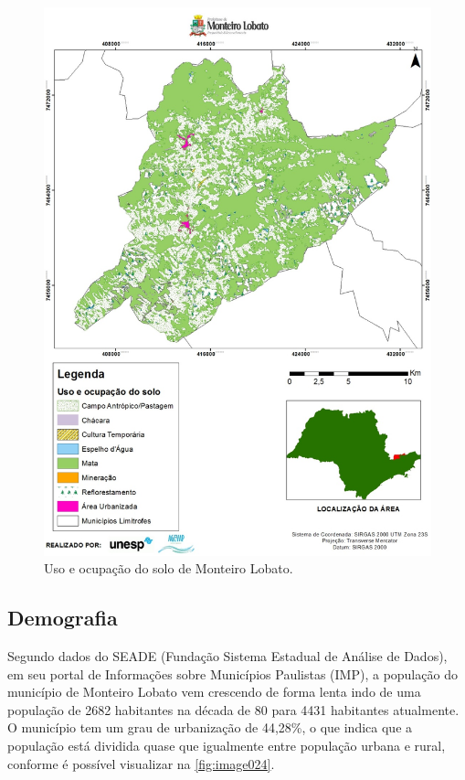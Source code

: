 \newpage
 \begin{figure}[h!]
	\centering
	\includegraphics[width=1\linewidth]{produtos/proddois/image023}
	\caption{Uso e ocupação do solo de Monteiro Lobato.}
	\label{fig:image023}
\end{figure}
\clearpage

\subsection{Demografia}
Segundo dados do SEADE (Fundação Sistema Estadual de Análise de Dados), em seu portal de Informações sobre Municípios Paulistas (IMP), a população do município de Monteiro Lobato vem crescendo de forma lenta indo de uma população de 2682 habitantes na década de 80 para 4431 habitantes atualmente. O município tem um grau de urbanização de 44,28\%, o que indica que a população está dividida quase que igualmente entre população urbana e rural, conforme é possível visualizar na \autoref{fig:image024}. 

